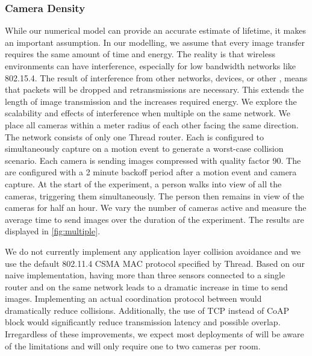 \subsubsection{Camera Density}
While our numerical model can provide an accurate estimate of lifetime, it makes an important assumption. In our modelling, we assume that every image transfer requires the same amount of time and energy. The reality is that wireless environments can have interference, especially for low bandwidth networks like 802.15.4. The result of interference from other networks, devices, or other \namecs, means that packets will be dropped and retransmissions are necessary. This extends the length of image transmission and the increases required energy. 
We explore the scalability and effects of interference when multiple \namecs on the same network. We place all cameras within a meter radius of each other facing the same direction. The network consists of only one Thread router. Each \name is configured to simultaneously capture on a motion event to generate a worst-case collision scenario. Each camera is sending images compressed with quality factor 90.
The \namecs are configured with a 2 minute backoff period after a motion event and camera capture. At the start of the experiment, a person walks into view of all the cameras, triggering them simultaneously. The person then remains in view of the cameras for half an hour. We vary the number of cameras active and measure the average time to send images over the duration of the experiment. The results are displayed in \cref{fig:multiple}.

We do not currently implement any application layer collision avoidance and we use the default 802.11.4 CSMA MAC protocol specified by Thread. Based on our naive implementation, having more than three \name sensors connected to a single router and on the same network leads to a dramatic increase in time to send images. Implementing an actual coordination protocol between \namecs would dramatically reduce collisions. Additionally, the use of  TCP instead of CoAP block would significantly reduce transmission latency and possible overlap.
Irregardless of these improvements, we expect most deployments of \name will be aware of the limitations and will only require one to two cameras per room.

